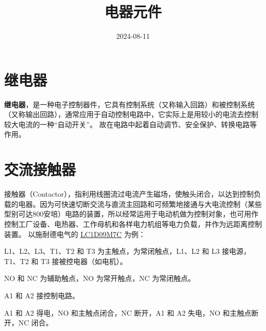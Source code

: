 


\title{电器元件}
\date{2024-08-11}


\maketitle\newpage
\tableofcontents\newpage

\section{继电器}
\textbf{继电器}，是一种电子控制器件，它具有控制系统（又称输入回路）和被控制系统（又称输出回路），通常应用于自动控制电路中，它实际上是用较小的电流去控制较大电流的一种“自动开关”。 故在电路中起着自动调节、安全保护、转换电路等作用。

\section{交流接触器}
接触器（Contactor），指利用线圈流过电流产生磁场，使触头闭合，以达到控制负载的电器。因为可快速切断交流与直流主回路和可频繁地接通与大电流控制（某些型别可达800安培）电路的装置，所以经常运用于电动机做为控制对象，也可用作控制工厂设备、电热器、工作母机和各样电力机组等电力负载，并作为远距离控制装置。
以施耐德电气的 \href{https://www.schneider-electric.cn/zh/product/LC1D09M7C/tesys-deca\%E6\%8E\%A5\%E8\%A7\%A6\%E5\%99\%A83\%E6\%9E\%813noac3-ac3e440v9a220vac\%E8\%9E\%BA\%E9\%92\%89\%E7\%AB\%AF\%E5\%AD\%90/}{\underline{LC1D09M7C}} 为例：


L1、L2、L3、T1、T2 和 T3 为主触点，为常闭触点，L1、L2 和 L3 接电源，T1、T2 和 T3 接被控电器（如电机）。

NO 和 NC 为辅助触点，NO 为常开触点，NC 为常闭触点。

A1 和 A2 接控制电路。

A1 和 A2 得电，NO 和主触点闭合，NC 断开，A1 和 A2 失电，NO 和主触点断开，NC 闭合。

